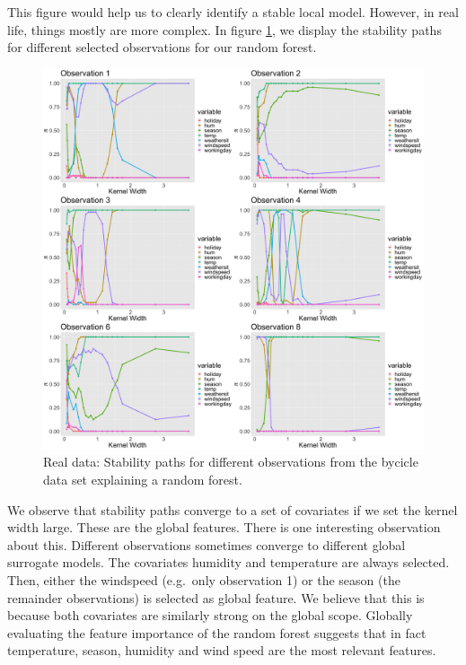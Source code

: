 \documentclass[
]{krantz}
\begin{document}
This figure would help us to clearly identify a stable local model.
However, in real life, things mostly are more complex.
In figure \ref{fig:lime-fig14}, we display the stability paths for different selected observations for our random forest.

\begin{figure}

{\centering \includegraphics[width=0.99\linewidth]{images/04-09-15} 

}

\caption{Real data: Stability paths for different observations from the bycicle data set explaining a random forest.}\label{fig:lime-fig14}
\end{figure}

We observe that stability paths converge to a set of covariates if we set the kernel width large.
These are the global features.
There is one interesting observation about this.
Different observations sometimes converge to different global surrogate models.
The covariates humidity and temperature are always selected.
Then, either the windspeed (e.g.~only observation 1) or the season (the remainder observations) is selected as global feature.
We believe that this is because both covariates are similarly strong on the global scope.
Globally evaluating the feature importance of the random forest suggests that in fact temperature, season, humidity and wind speed are the most relevant features.
\end{document}
